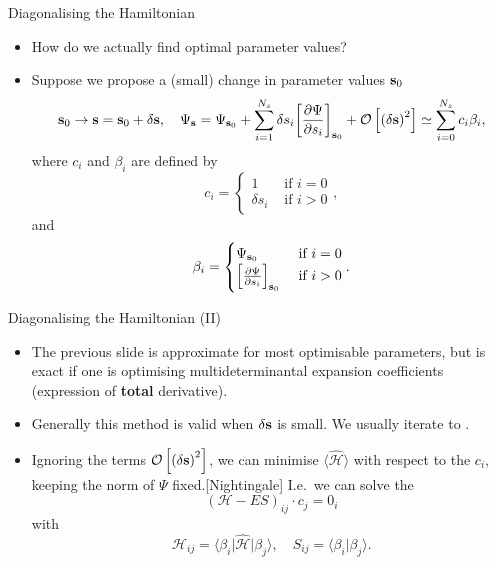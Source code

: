 \documentclass[12pt, pdf, hyperref={draft}, usenames, dvipsnames,
aspectratio=169]{beamer}
\newcommand{\ket}[1]{\lvert{#1}\rangle}
\newcommand{\bra}[1]{\langle{#1}\rvert}
\newcommand{\expt}[1]{\langle{#1}\rangle}
\newcommand{\blue}[1]{{\bf\color{NavyBlue}{#1}}}
\newcommand{\green}[1]{{\bf\color{ForestGreen}{#1}}}
\begin{document}
\begin{frame}{Diagonalising the Hamiltonian}

\begin{itemize}
  \item How do we actually find optimal parameter
  values?
  \item Suppose we propose a (small) change in parameter values ${\bf s}_0$
  \begin{equation}
    {\bf s}_0 \rightarrow {\bf s} = {\bf s}_0 + {\bf \delta s},\quad \Psi_{\bf
    s} = \Psi_{{\bf s}_0} +
    \sum^{N_s}_{i=1} \delta s_i{\left[ \dfrac{\partial \Psi}{\partial s_i}
    \right]}_{{\bf s}_0} +
    \mathcal{O}\left[{({\delta \bf s})}^2\right] \simeq
    \sum^{N_s}_{i=0} c_i \beta_i,
  \end{equation}
  where $c_i$ and $\beta_i$ are defined by
  \begin{equation}
    c_i =
    \begin{cases}
    1 &\text{ if } i=0 \\
    \delta s_i &\text{ if } i>0
    \end{cases},
  \end{equation}
  and
  \begin{equation}
    \beta_i = \begin{cases}
      \Psi_{{\bf s}_0} &\text{ if } i=0 \\
      {\left[ \frac{\partial \Psi}{\partial s_i}  \right]}_{{\bf s}_0}
      &\text{ if } i>0
    \end{cases}.
  \end{equation}
\end{itemize}
\end{frame}


\begin{frame}{Diagonalising the Hamiltonian (II)}

\begin{itemize}
  \item The previous slide is approximate for most optimisable parameters, but
  is exact if one is optimising multideterminantal expansion
  coefficients (expression of \textbf{total} derivative).

  \item Generally this method is valid when $\delta {\bf s}$ is small. We
  usually iterate to \green{self-consistency}.

  \item Ignoring the terms $\mathcal{O}\left[ {(\delta{\bf s})}^2 \right]$, we
  can minimise $\expt{\mathcal{\hat H}}$ with respect to the $c_i$, keeping the
  norm of $\Psi$ fixed.[Nightingale] I.e.\ we can solve the \blue{secular equation}
  \begin{equation}
    {\left( \mathcal{H} - E S  \right)}_{ij}\cdot c_j = 0_i
  \end{equation}
  with
  \begin{equation}
    \mathcal{H}_{ij} = \bra{\beta_i} \mathcal{\hat H} \ket{\beta_j},\quad S_{ij}
    = \bra{\beta_i} \beta_j \rangle.
  \end{equation}
\end{itemize}
\end{frame}
\end{document}
